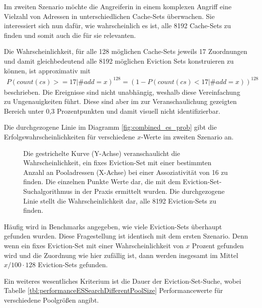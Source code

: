 Im zweiten Szenario möchte die Angreiferin in einem komplexen Angriff eine Vielzahl von Adressen in unterschiedlichen Cache-Sets überwachen. 
Sie interessiert sich nun dafür, wie wahrscheinlich es ist, alle 8192 Cache-Sets zu finden und somit auch die für sie relevanten. 

Die Wahrscheinlichkeit, für alle 128 möglichen Cache-Sets jeweils 17 Zuordnungen und damit gleichbedeutend alle 8192 möglichen Eviction Sets konstruieren zu können, ist approximativ mit
\begin{align*}
P(count(cs)>=17|\#add = x)^{128} = (1-P(count(cs)<17|\#add = x))^{128}
\end{align*}
beschrieben.
Die Ereignisse sind nicht unabhängig, weshalb diese Vereinfachung zu Ungenauigkeiten führt.
Diese sind aber im zur Veranschaulichung gezeigten Bereich unter 0,3 Prozentpunkten und damit visuell nicht identifizierbar.

Die durchgezogene Linie im Diagramm \ref{fig:combined_es_prob} gibt die Erfolgswahrscheinlichkeiten für verschiedene $x$-Werte im zweiten Szenario an. 


\label{fig:combined_es_prob}
\begin{figure}[h]
\centering
\begin{scaletikzpicturetowidth}{\textwidth}

\end{scaletikzpicturetowidth}
\caption{Die gestrichelte Kurve (Y-Achse) veranschaulicht die Wahrscheinlichkeit, ein fixes Eviction-Set mit einer bestimmten Anzahl an Pooladressen (X-Achse) bei einer Assoziativität von 16 zu finden. Die einzelnen Punkte Werte dar, die mit dem Eviction-Set-Suchalgorithmus in der Praxis ermittelt wurden.
Die durchgezogene Linie stellt die Wahrscheinlichkeit dar, alle 8192 Eviction-Sets zu finden.}
\end{figure}

Häufig wird in Benchmarks angegeben, wie viele Eviction-Sets überhaupt gefunden wurden.
Diese Fragestellung ist identisch mit dem ersten Szenario.
Denn wenn ein fixes Eviction-Set mit einer Wahrscheinlichkeit von $x$ Prozent gefunden wird und die Zuordnung wie hier zufällig ist, dann werden insgesamt im Mittel $x/100 \cdot 128$ Eviction-Sets gefunden.

Ein weiteres wesentliches Kriterium ist die Dauer der Eviction-Set-Suche, wobei Tabelle \ref{tbl:performanceESSearchDifferentPoolSize} Performancewerte für verschiedene Poolgrößen angibt.

